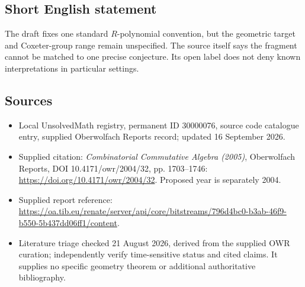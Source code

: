 \documentclass[11pt]{article}
\begin{document}
\subsection{Short English statement}
The draft fixes one standard $R$-polynomial convention, but the geometric target and Coxeter-group range remain unspecified. The source itself says the fragment cannot be matched to one precise conjecture. Its open label does not deny known interpretations in particular settings.
\subsection{Sources}
\begin{itemize}
\item Local UnsolvedMath registry, permanent ID 30000076, source code catalogue entry, supplied Oberwolfach Reports record; updated 16 September 2026.
\item Supplied citation: \emph{Combinatorial Commutative Algebra (2005)}, Oberwolfach Reports, DOI 10.4171/owr/2004/32, pp. 1703--1746: \url{https://doi.org/10.4171/owr/2004/32}. Proposed year is separately 2004.
\item Supplied report reference: \url{https://oa.tib.eu/renate/server/api/core/bitstreams/796d4bc0-b3ab-46f9-b550-5b437dd06ff1/content}.
\item Literature triage checked 21 August 2026, derived from the supplied OWR curation; independently verify time-sensitive status and cited claims. It supplies no specific geometry theorem or additional authoritative bibliography.
\end{itemize}
\end{document}
